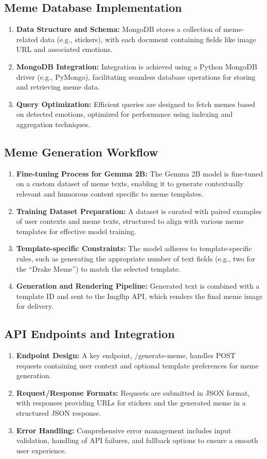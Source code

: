 \documentclass[conference]{IEEEtran}
\begin{document}
\subsection{Meme Database Implementation}
\begin{enumerate}
    \item \textbf{Data Structure and Schema:} MongoDB stores a collection of meme-related data (e.g., stickers), with each document containing fields like image URL and associated emotions.
    \item \textbf{MongoDB Integration:} Integration is achieved using a Python MongoDB driver (e.g., PyMongo), facilitating seamless database operations for storing and retrieving meme data.
    \item \textbf{Query Optimization:} Efficient queries are designed to fetch memes based on detected emotions, optimized for performance using indexing and aggregation techniques.
\end{enumerate}

\subsection{Meme Generation Workflow}
\begin{enumerate}
    \item \textbf{Fine-tuning Process for Gemma 2B:} The Gemma 2B model is fine-tuned on a custom dataset of meme texts, enabling it to generate contextually relevant and humorous content specific to meme templates.
    \item \textbf{Training Dataset Preparation:} A dataset is curated with paired examples of user contexts and meme texts, structured to align with various meme templates for effective model training.
    \item \textbf{Template-specific Constraints:} The model adheres to template-specific rules, such as generating the appropriate number of text fields (e.g., two for the “Drake Meme”) to match the selected template.
    \item \textbf{Generation and Rendering Pipeline:} Generated text is combined with a template ID and sent to the Imgflip API, which renders the final meme image for delivery.
\end{enumerate}

\subsection{API Endpoints and Integration}
\begin{enumerate}
    \item \textbf{Endpoint Design:} A key endpoint, /generate-meme, handles POST requests containing user context and optional template preferences for meme generation.
    \item \textbf{Request/Response Formats:} Requests are submitted in JSON format, with responses providing URLs for stickers and the generated meme in a structured JSON response.
    \item \textbf{Error Handling:} Comprehensive error management includes input validation, handling of API failures, and fallback options to ensure a smooth user experience.
\end{enumerate}
\end{document}
